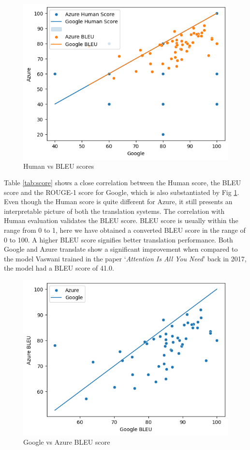 \begin{figure}[h]
    \centering
    \includegraphics[width=0.9\linewidth]{images/human_bleu.png}
    \caption{Human vs BLEU scores}
    \label{fig:human-v-bleu}
\end{figure}

Table \ref{tab:score} shows a close correlation between the Human score, the BLEU score and the ROUGE-1 score for Google, which is also substantiated by Fig \ref{fig:human-v-bleu}. Even though the Human score is quite different for Azure, it still presents an interpretable picture of both the translation systems. The correlation with Human evaluation validates the BLEU score. BLEU score is usually within the range from 0 to 1, here we have obtained a converted BLEU score in the range of 0 to 100. A higher BLEU score signifies better translation performance. Both Google and Azure translate show a significant improvement when compared to the model Vaswani trained in the paper `\textit{Attention Is All You Need}' \cite{vaswani2017attention} back in 2017, the model had a BLEU score of 41.0.

\begin{figure}[h]
    \centering
    \includegraphics[width=0.9\linewidth]{images/bleu.png}
    \caption{Google vs Azure BLEU score}
    \label{fig:google-v-azure}
\end{figure}

